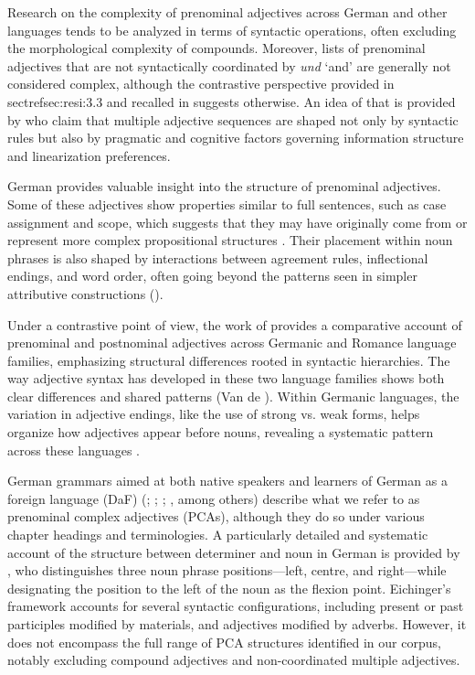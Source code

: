 \documentclass[output=paper,colorlinks,citecolor=brown]{langscibook}
\begin{document}
Research on the complexity of prenominal adjectives across German and other languages tends to be analyzed in terms of syntactic operations, often excluding the morphological complexity of compounds. Moreover, lists of prenominal adjectives that are not syntactically coordinated by \textit{und} ‘and’ are generally not considered complex, although the contrastive perspective provided in sectref{sec:resi:3.3} and recalled in  suggests otherwise. An idea of that is provided by \citet{KotowskiHärtl2019} who claim that multiple adjective sequences are shaped not only by syntactic rules but also by pragmatic and cognitive factors governing information structure and linearization preferences.

German provides valuable insight into the structure of prenominal adjectives. Some of these adjectives show properties similar to full sentences, such as case assignment and scope, which suggests that they may have originally come from or represent more complex propositional structures \citep{Fanselow1986}. Their placement within noun phrases is also shaped by interactions between agreement rules, inflectional endings, and word order, often going beyond the patterns seen in simpler attributive constructions (\citealt{vanRiemsdijk1983}).

Under a contrastive point of view, the work of \citet{Cinque2010} provides a comparative account of prenominal and postnominal adjectives across Germanic and Romance language families, emphasizing structural differences rooted in syntactic hierarchies. The way adjective syntax has developed in these two language families shows both clear differences and shared patterns (Van de \citealt{VeldeSleeman2014}). Within Germanic languages, the variation in adjective endings, like the use of strong vs. weak forms, helps organize how adjectives appear before nouns, revealing a systematic pattern across these languages \citep{Roehrs2015}.

German grammars aimed at both native speakers and learners of German as a foreign language (DaF) (\citealt{GötzeHess-Lüttich2002}; \citealt{Engel1988}; \citealt{DreyerSchmitt2001}; \citealt{Scollo2020}, among others) describe what we refer to as prenominal complex adjectives (PCAs), although they do so under various chapter headings and terminologies. A particularly detailed and systematic account of the structure between determiner and noun in German is provided by \citet{Eichinger2006}, who distinguishes three noun phrase positions—left, centre, and right—while designating the position to the left of the noun as the flexion point. Eichinger’s framework accounts for several syntactic configurations, including present or past participles modified by materials, and adjectives modified by adverbs. However, it does not encompass the full range of PCA structures identified in our corpus, notably excluding compound adjectives and non-coordinated multiple adjectives.
\end{document}
